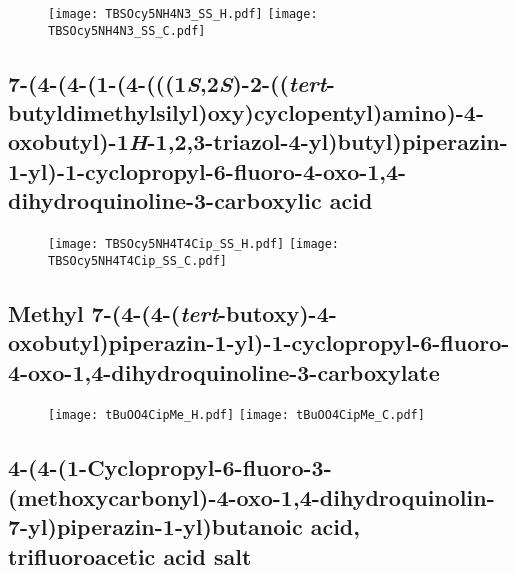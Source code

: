 \begin{figure}[H]
	\centering
		\texttt{[image: TBSOcy5NH4N3\_SS\_H.pdf]}
		\texttt{[image: TBSOcy5NH4N3\_SS\_C.pdf]}
\end{figure}

\subsection{7\hyp{}(4\hyp{}(4\hyp{}(1\hyp{}(4\hyp{}(((1\textit{S},2\textit{S})\hyp{}2\hyp{}((\textit{tert}\hyp{}butyldimethylsilyl)oxy)cyclopentyl)amino)\hyp{}4\hyp{}oxobutyl)\hyp{}1\textit{H}\hyp{}1,2,3\hyp{}triazol\hyp{}4\hyp{}yl)butyl)piperazin\hyp{}1\hyp{}yl)\hyp{}1\hyp{}cyclopropyl\hyp{}6\hyp{}fluoro\hyp{}4\hyp{}oxo\hyp{}1,4\hyp{}dihydroquinoline\hyp{}3\hyp{}carboxylic acid }

\begin{figure}[H]
	\centering
		\texttt{[image: TBSOcy5NH4T4Cip\_SS\_H.pdf]}
		\texttt{[image: TBSOcy5NH4T4Cip\_SS\_C.pdf]}
\end{figure}

\subsection{Methyl 7\hyp{}(4\hyp{}(4\hyp{}(\textit{tert}\hyp{}butoxy)\hyp{}4\hyp{}oxobutyl)piperazin\hyp{}1\hyp{}yl)\hyp{}1\hyp{}cyclopropyl\hyp{}6\hyp{}fluoro\hyp{}4\hyp{}oxo\hyp{}1,4\hyp{}dihydroquinoline\hyp{}3\hyp{}carboxylate }

\begin{figure}[H]
	\centering
		\texttt{[image: tBuOO4CipMe\_H.pdf]}
		\texttt{[image: tBuOO4CipMe\_C.pdf]}
\end{figure}

\subsection{4\hyp{}(4\hyp{}(1\hyp{}Cyclopropyl\hyp{}6\hyp{}fluoro\hyp{}3\hyp{}(methoxycarbonyl)\hyp{}4\hyp{}oxo\hyp{}1,4\hyp{}dihydroquinolin\hyp{}7\hyp{}yl)piperazin\hyp{}1\hyp{}yl)bu\allowbreak tanoic acid, trifluoroacetic acid salt }

